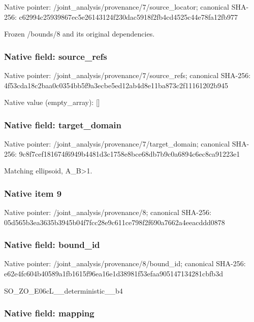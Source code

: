 \documentclass[10pt,a4paper]{article}
\begin{document}
Native pointer: /joint\_analysis/provenan\allowbreak{}ce/7/source\_locator; canonical SHA-256: c62994c25939867ec5e26143\allowbreak{}124f230dac5918f2fb4cd452\allowbreak{}5c44e78fa12fb977


Frozen /bounds/8 and its original dependencies.


\subsubsection{Native field: source\_refs}


Native pointer: /joint\_analysis/provenan\allowbreak{}ce/7/source\_refs; canonical SHA-256: 4f53cda18c2baa0c0354bb5f\allowbreak{}9a3ecbe5ed12ab4d8e11ba87\allowbreak{}3c2f11161202b945



Native value (empty\_array): []



\subsubsection{Native field: target\_domain}


Native pointer: /joint\_analysis/provenan\allowbreak{}ce/7/target\_domain; canonical SHA-256: 9c8f7cef181674f6949b4481\allowbreak{}d3c1758e8bce68db7b9c0a68\allowbreak{}94c6ec8ca91223e1


Matching ellipsoid, A\_B>1.


\subsubsection{Native item 9}


Native pointer: /joint\_analysis/provenance/8; canonical SHA-256: 05d565b3ea3635b3945b04f7\allowbreak{}fcc28e9c611ce798f2f690a7\allowbreak{}662a4eeacddd0878



\subsubsection{Native field: bound\_id}


Native pointer: /joint\_analysis/provenance/8/bound\_id; canonical SHA-256: e62e4fc604b40589a1fb1615\allowbreak{}f96ea16e1d38981f53efaa90\allowbreak{}5147134281cbfb3d


SO\_ZO\_E06cL\_\_deterministic\_\_b4


\subsubsection{Native field: mapping}
\end{document}
